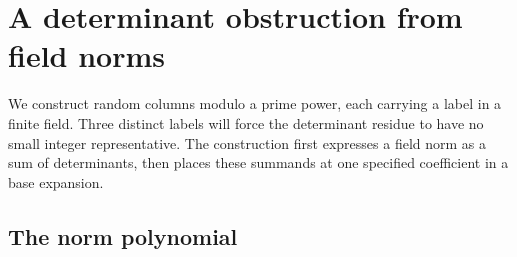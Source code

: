 \section{A determinant obstruction from field norms}
\label{norm:section}

We construct random columns modulo a prime power, each carrying a label in
a finite field.  Three distinct labels will force the determinant residue
to have no small integer representative.  The construction first expresses
a field norm as a sum of determinants, then places these summands at one
specified coefficient in a base expansion.

\subsection{The norm polynomial}

